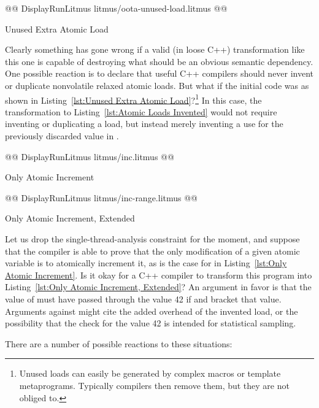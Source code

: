 \documentclass[10]{article}
\begin{document}
\begin{listing}[tbp]
@@ DisplayRunLitmus litmus/oota-unused-load.litmus @@
\caption{Unused Extra Atomic Load}
\label{lst:Unused Extra Atomic Load}
\end{listing}

Clearly something has gone wrong if a valid (in loose C++) transformation
like this one is capable of destroying what should be an obvious semantic
dependency.
One possible reaction is to declare that useful C++ compilers should never
invent or duplicate nonvolatile relaxed atomic loads.
But what if the initial code was as shown in
Listing~\ref{lst:Unused Extra Atomic Load}?\footnote{
	Unused loads can easily be generated by complex macros or
	template metaprograms.
	Typically compilers then remove them, but they are not obliged to.}
In this case, the transformation to
Listing~\ref{lst:Atomic Loads Invented}
would not require inventing or duplicating a load,
but instead merely inventing a use for
the previously discarded value in .

\begin{listing}[tbp]
@@ DisplayRunLitmus litmus/inc.litmus @@
\caption{Only Atomic Increment}
\label{lst:Only Atomic Increment}
\end{listing}

\begin{listing}[tbp]
@@ DisplayRunLitmus litmus/inc-range.litmus @@
\caption{Only Atomic Increment, Extended}
\label{lst:Only Atomic Increment, Extended}
\end{listing}

Let us drop the single-thread-analysis constraint for
the moment, and suppose that the compiler is able to prove
that the only modification of a given atomic variable is to atomically
increment it, as is the case for  in
Listing~\ref{lst:Only Atomic Increment}.
Is it okay for a C++ compiler to transform this program into
Listing~\ref{lst:Only Atomic Increment, Extended}?
An argument in favor is that the value of  must have
passed through the value 42 if  and 
bracket that value.
Arguments against might cite the added overhead of the invented load,
or the possibility that the check for the value 42 is intended for statistical
sampling.

There are a number of possible reactions to these situations:
\end{document}
